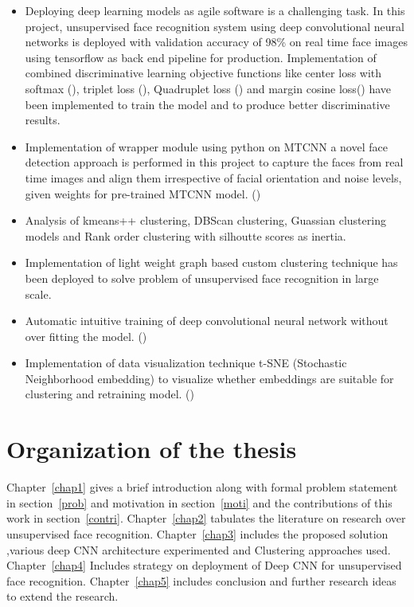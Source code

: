 \documentclass[a4paper,12pt, twoside]{NITKReport}
\begin{document}
\begin{itemize}
\item Deploying deep learning models as agile software is a challenging task. In this project, unsupervised face recognition system using deep convolutional neural networks is deployed with validation accuracy of 98\% on real time face images using tensorflow as back end pipeline for production. Implementation of combined discriminative learning objective functions like center loss with softmax (\cite{wen2016discriminative}), triplet loss (\cite{schroff2015facenet}), Quadruplet loss (\cite{chen2017beyond}) and margin cosine loss(\cite{DBLP:journals/corr/abs-1801-09414}) have been implemented to train the model and to produce better discriminative results.
\item Implementation of wrapper module using python on MTCNN a novel face detection approach is performed in this project to capture the faces from real time images and align them irrespective of facial orientation and noise levels, given weights for pre-trained MTCNN model. (\cite{xiang2017joint})
\item Analysis of kmeans++ clustering, DBScan clustering, Guassian clustering models and Rank order clustering with silhoutte scores as inertia.
\item Implementation of light weight graph based custom clustering technique has been deployed to solve problem of unsupervised face recognition in large scale. 
\item Automatic intuitive training of deep convolutional neural network without over fitting the model. (\cite{DBLP:journals/corr/CogswellAGZB15})
\item Implementation of data visualization technique t-SNE (Stochastic Neighborhood embedding) to visualize whether embeddings are suitable for clustering and retraining model. (\cite{maaten2008visualizing}) 

\end{itemize}
	
\section{Organization of the thesis}
	Chapter~\ref{chap1} gives a brief introduction along with formal problem statement in section~\ref{prob} and motivation in section~\ref{moti} and the contributions of this work in section~\ref{contri}. Chapter~\ref{chap2} tabulates the literature on research over unsupervised face recognition. Chapter~\ref{chap3} includes the proposed solution ,various deep CNN architecture experimented and Clustering approaches used. Chapter~\ref{chap4} Includes strategy on deployment of Deep CNN for unsupervised face recognition. Chapter~\ref{chap5} includes conclusion and further research ideas to extend the research.  
	
\end{document}
